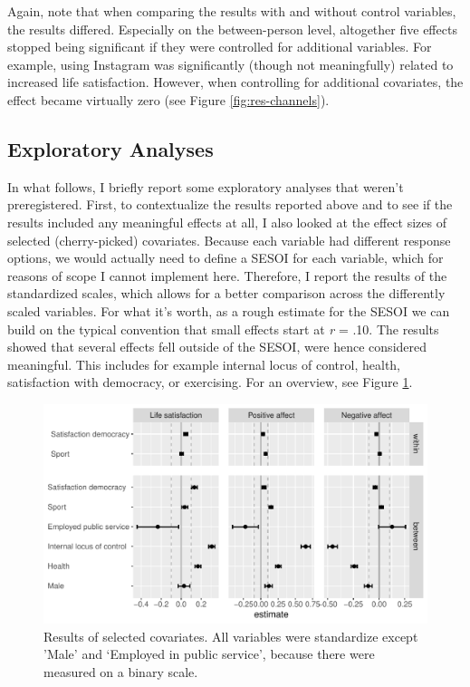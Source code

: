 \documentclass[
  english,
  man,mask,floatsintext]{apa6}
\begin{document}
Again, note that when comparing the results with and without control variables, the results differed.
Especially on the between-person level, altogether five effects stopped being significant if they were controlled for additional variables.
For example, using Instagram was significantly (though not meaningfully) related to increased life satisfaction.
However, when controlling for additional covariates, the effect became virtually zero (see Figure \ref{fig:res-channels}).

\hypertarget{exploratory-analyses}{%
\subsection{Exploratory Analyses}\label{exploratory-analyses}}

In what follows, I briefly report some exploratory analyses that weren't preregistered.
First, to contextualize the results reported above and to see if the results included any meaningful effects at all, I also looked at the effect sizes of selected (cherry-picked) covariates.
Because each variable had different response options, we would actually need to define a SESOI for each variable, which for reasons of scope I cannot implement here.
Therefore, I report the results of the standardized scales,
which allows for a better comparison across the differently scaled variables.
For what it's worth, as a rough estimate for the SESOI we can build on the typical convention that small effects start at \emph{r} = \textbar.10\textbar.
The results showed that several effects fell outside of the SESOI, were hence considered meaningful.
This includes for example internal locus of control, health, satisfaction with democracy, or exercising.
For an overview, see Figure \ref{fig:res-control}.

\begin{figure}
\includegraphics[width=\textwidth]{figures/fig_results_control_std} \caption{Results of selected covariates. All variables were standardize except 'Male'  and ‘Employed in public service', because there were measured on a binary scale.}\label{fig:res-control}
\end{figure}
\end{document}
